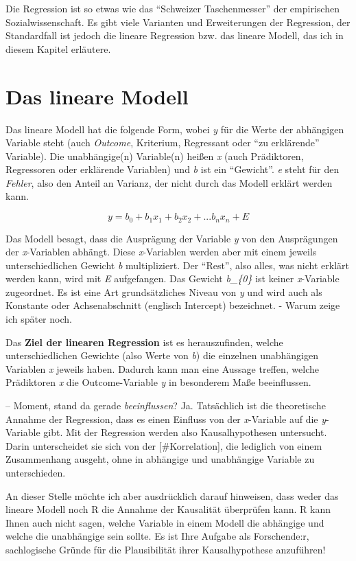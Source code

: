 \documentclass[
]{book}
\begin{document}
Die Regression ist so etwas wie das ``Schweizer Taschenmesser'' der empirischen Sozialwissenschaft. Es gibt viele Varianten und Erweiterungen der Regression, der Standardfall ist jedoch die lineare Regression bzw. das lineare Modell, das ich in diesem Kapitel erläutere.

\hypertarget{das-lineare-modell}{%
\section{Das lineare Modell}\label{das-lineare-modell}}

Das lineare Modell hat die folgende Form, wobei \emph{y} für die Werte der abhängigen Variable steht (auch \emph{Outcome}, Kriterium, Regressant oder ``zu erklärende'' Variable). Die unabhängige(n) Variable(n) heißen \emph{x} (auch Prädiktoren, Regressoren oder erklärende Variablen) und \emph{b} ist ein ``Gewicht''. \emph{e} steht für den \emph{Fehler}, also den Anteil an Varianz, der nicht durch das Modell erklärt werden kann.

\[y = b_{0}+b_{1}x_{1}+b_{2}x_{2}+... b_{n}x_{n}+E\]

Das Modell besagt, dass die Ausprägung der Variable \emph{y} von den Ausprägungen der \emph{x}-Variablen abhängt. Diese \emph{x}-Variablen werden aber mit einem jeweils unterschiedlichen Gewicht \emph{b} multipliziert. Der ``Rest'', also alles, was nicht erklärt werden kann, wird mit \emph{E} aufgefangen. Das Gewicht \emph{b\_\{0\}} ist keiner \emph{x}-Variable zugeordnet. Es ist eine Art grundsätzliches Niveau von \emph{y} und wird auch als Konstante oder Achsenabschnitt (englisch Intercept) bezeichnet. - Warum zeige ich später noch.

Das \textbf{Ziel der linearen Regression} ist es herauszufinden, welche unterschiedlichen Gewichte (also Werte von \emph{b}) die einzelnen unabhängigen Variablen \emph{x} jeweils haben. Dadurch kann man eine Aussage treffen, welche Prädiktoren \emph{x} die Outcome-Variable \emph{y} in besonderem Maße beeinflussen.

-- Moment, stand da gerade \emph{beeinflussen}? Ja. Tatsächlich ist die theoretische Annahme der Regression, dass es einen Einfluss von der \emph{x}-Variable auf die \emph{y}-Variable gibt. Mit der Regression werden also Kausalhypothesen untersucht. Darin unterscheidet sie sich von der {[}\#Korrelation{]}, die lediglich von einem Zusammenhang ausgeht, ohne in abhängige und unabhängige Variable zu unterschieden.

An dieser Stelle möchte ich aber ausdrücklich darauf hinweisen, dass weder das lineare Modell noch R die Annahme der Kausalität überprüfen kann. R kann Ihnen auch nicht sagen, welche Variable in einem Modell die abhängige und welche die unabhängige sein sollte. Es ist Ihre Aufgabe als Forschende:r, sachlogische Gründe für die Plausibilität ihrer Kausalhypothese anzuführen!
\end{document}
